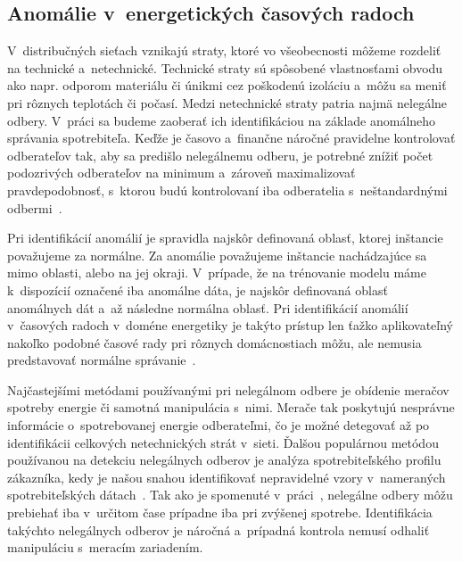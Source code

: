 \documentclass[a4paper,twoside,slovak,12pt,appendix]{article}
\begin{document}

\subsection{Anomálie v~energetických časových radoch}
V~distribučných sieťach vznikajú straty, ktoré vo všeobecnosti môžeme rozdeliť
na technické a~netechnické. Technické straty sú spôsobené vlastnosťami
obvodu ako napr. odporom materiálu či únikmi cez poškodenú izoláciu a~môžu sa
meniť pri rôznych teplotách či počasí. Medzi netechnické straty patria najmä
nelegálne odbery. V~práci sa budeme zaoberať ich identifikáciou na základe
anomálneho správania spotrebiteľa. Keďže je časovo a~finančne náročné
pravidelne kontrolovať odberateľov tak, aby sa predišlo nelegálnemu odberu,
je potrebné znížiť počet podozrivých odberateľov na minimum a~zároveň
maximalizovať pravdepodobnosť, s~ktorou budú kontrolovaní iba odberatelia
s~neštandardnými odbermi~\cite{Coma-Puig2016,Sahoo2015}.

Pri identifikácií anomálií je spravidla najskôr definovaná oblasť, ktorej
inštancie považujeme za normálne. Za anomálie považujeme inštancie nachádzajúce
sa mimo oblasti, alebo na jej okraji. V~prípade, že na trénovanie modelu máme
k~dispozícií označené iba anomálne dáta, je najskôr definovaná oblasť anomálnych
dát a~až následne normálna oblasť. Pri identifikácií anomálií v~časových radoch
v~doméne energetiky je takýto prístup len ťažko aplikovateľný nakoľko podobné
časové rady pri rôznych domácnostiach môžu, ale nemusia predstavovať normálne
správanie~\cite{Spiric2015}.

Najčastejšími metódami používanými pri nelegálnom odbere je obídenie meračov
spotreby energie či samotná manipulácia s~nimi. Merače tak poskytujú nesprávne
informácie o~spotrebovanej energie odberateľmi, čo je možné detegovať až po
identifikácii celkových netechnických strát v~sieti. Ďalšou populárnou metódou
používanou na detekciu nelegálnych odberov je analýza spotrebiteľského
profilu zákazníka, kedy je našou snahou identifikovať nepravidelné vzory
v~nameraných spotrebiteľských dátach~\cite{Sahoo2015}. Tak ako je spomenuté
v~práci~\cite{Depuru2012}, nelegálne odbery môžu prebiehať iba v~určitom čase
prípadne iba pri zvýšenej spotrebe. Identifikácia takýchto nelegálnych odberov
je náročná a~prípadná kontrola nemusí odhaliť manipuláciu s~meracím zariadením.
\end{document}
